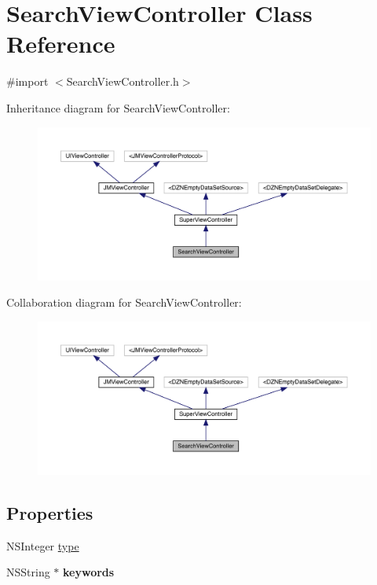 \hypertarget{interface_search_view_controller}{}\section{Search\+View\+Controller Class Reference}
\label{interface_search_view_controller}


{\ttfamily \#import $<$Search\+View\+Controller.\+h$>$}



Inheritance diagram for Search\+View\+Controller\+:\nopagebreak
\begin{figure}[H]
\begin{center}
\leavevmode
\includegraphics[width=350pt]{interface_search_view_controller__inherit__graph}
\end{center}
\end{figure}


Collaboration diagram for Search\+View\+Controller\+:\nopagebreak
\begin{figure}[H]
\begin{center}
\leavevmode
\includegraphics[width=350pt]{interface_search_view_controller__coll__graph}
\end{center}
\end{figure}
\subsection*{Properties}
\begin{DoxyCompactItemize}
\item 
N\+S\+Integer \mbox{\hyperlink{interface_search_view_controller_a19f66c74b82b10695056b06087bfc773}{type}}
\item 
\mbox{\label{interface_search_view_controller_a22ff5376f5209b26551b1cd3e1ca31d9}} 
N\+S\+String $\ast$ {\bfseries keywords}
\end{DoxyCompactItemize}
